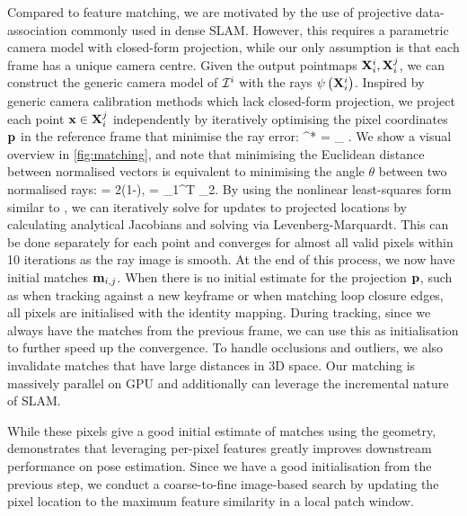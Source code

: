 \documentclass[10pt,twocolumn,letterpaper]{article}
\begin{document}
Compared to feature matching, we are motivated by the use of projective data-association commonly used in dense SLAM.  However, this requires a parametric camera model with closed-form projection, while our only assumption is that each frame has a unique camera centre.  Given the output pointmaps ${{\mathbf X}}^i_{i}, {{\mathbf X}}^j_{i}$, we can construct the generic camera model of $\mathcal{I}^i$ with the rays
$\psi\left({{\mathbf X}}^i_{i}\right)$.  Inspired by generic camera calibration methods \cite{rosebrock_generic_2012, schops_why_2020} which lack closed-form projection, we project each point $\mathbf{x} \in {{\mathbf X}}^j_{i}$ independently by iteratively optimising the pixel coordinates $\mathbf{p}$ in the reference frame that minimise the ray error:
\beq
    \pix^* = \argmin_{\pix} .
\eeq
We show a visual overview in \cref{fig:matching}, and note that minimising the Euclidean distance between normalised vectors is equivalent to minimising the angle $\theta$ between two normalised rays:
\beq
     = 2(1-\cos{\theta}), \quad \cos{\theta} = \psi_1^T \psi_2.
    \label{eq:ray_error}
\eeq
By using the nonlinear least-squares form similar to \cite{schops_why_2020}, we can iteratively solve for updates to projected locations by calculating analytical Jacobians and solving via Levenberg-Marquardt.
This can be done separately for each point and converges for almost all valid pixels within 10 iterations as the ray image is smooth.  At the end of this process, we now have initial matches ${{\mathbf {m}}}_{i,j}$.  When there is no initial estimate for the projection $\mathbf{p}$, such as when tracking against a new keyframe or when matching loop closure edges, all pixels are initialised with the identity mapping.  During tracking, since we always have the matches from the previous frame, we can use this as initialisation to further speed up the convergence.  To handle occlusions and outliers, we also invalidate matches that have large distances in 3D space.  Our matching is massively parallel on GPU and additionally can leverage the incremental nature of SLAM.

While these pixels give a good initial estimate of matches using the geometry, \master demonstrates that leveraging per-pixel features greatly improves downstream performance on pose estimation.  Since we have a good initialisation from the previous step, we conduct a coarse-to-fine image-based search by updating the pixel location to the maximum feature similarity in a local patch window.
\end{document}
